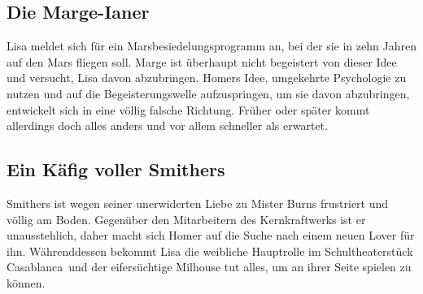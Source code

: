 \subsection{Die Marge-Ianer}
Lisa meldet sich für ein Marsbesiedelungsprogramm an, bei der sie in zehn Jahren auf den Mars fliegen soll. Marge ist überhaupt nicht begeistert von dieser Idee und versucht, Lisa davon abzubringen. Homers Idee, umgekehrte Psychologie zu nutzen und auf die Begeisterungswelle aufzuspringen, um sie davon abzubringen, entwickelt sich in eine völlig falsche Richtung. Früher oder später kommt allerdings doch alles anders und vor allem schneller als erwartet.


\subsection{Ein Käfig voller Smithers}
Smithers ist wegen seiner unerwiderten Liebe zu Mister Burns frustriert und völlig am Boden. Gegenüber den Mitarbeitern des Kernkraftwerks ist er unausstehlich, daher macht sich Homer auf die Suche nach einem neuen Lover für ihn. Währenddessen bekommt Lisa die weibliche Hauptrolle im Schultheaterstück \glqq Casablanca\grqq\ und der eifersüchtige Milhouse tut alles, um an ihrer Seite spielen zu können.


